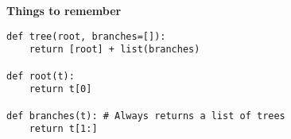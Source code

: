 \textbf{Things to remember}
\begin{lstlisting}
def tree(root, branches=[]):
    return [root] + list(branches)

def root(t):
    return t[0]

def branches(t): # Always returns a list of trees
    return t[1:]
\end{lstlisting}

